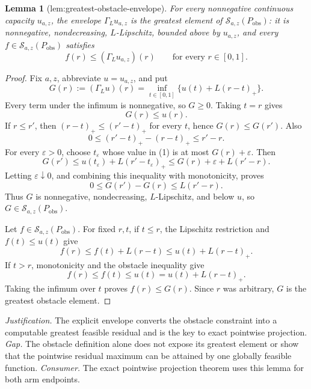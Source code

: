 \documentclass{article}
\newtheorem{lemma}{Lemma}
\begin{document}
\begin{lemma}[lem:greatest-obstacle-envelope]\label{lem:greatest-obstacle-envelope}
For every nonnegative continuous capacity \(u_{a,z}\), the envelope \(\Gamma_Lu_{a,z}\) is the greatest element of \(\mathcal S_{a,z}(P_{\mathrm{obs}})\): it is nonnegative, nondecreasing, \(L\)-Lipschitz, bounded above by \(u_{a,z}\), and every \(f\in\mathcal S_{a,z}(P_{\mathrm{obs}})\) satisfies
\[
f(r)\leq(\Gamma_Lu_{a,z})(r)\qquad\text{for every }r\in[0,1].
\]
\end{lemma}
\begin{proof}
Fix \(a,z\), abbreviate \(u=u_{a,z}\), and put
\[
G(r):=(\Gamma_Lu)(r)=\inf_{t\in[0,1]}\{u(t)+L(r-t)_+\}.
\tag{1}
\]
Every term under the infimum is nonnegative, so \(G\geq0\).  Taking \(t=r\) gives
\[
G(r)\leq u(r).
\tag{2}
\]
If \(r\leq r'\), then \((r-t)_+\leq(r'-t)_+\) for every \(t\), hence \(G(r)\leq G(r')\).  Also
\[
0\leq(r'-t)_+-(r-t)_+\leq r'-r.
\tag{3}
\]
For every \(\varepsilon>0\), choose \(t_\varepsilon\) whose value in (1) is at most \(G(r)+\varepsilon\).  Then
\[
G(r')
\leq u(t_\varepsilon)+L(r'-t_\varepsilon)_+
\leq G(r)+\varepsilon+L(r'-r).
\]
Letting \(\varepsilon\downarrow0\), and combining this inequality with monotonicity, proves
\[
0\leq G(r')-G(r)\leq L(r'-r).
\tag{4}
\]
Thus \(G\) is nonnegative, nondecreasing, \(L\)-Lipschitz, and below \(u\), so \(G\in\mathcal S_{a,z}(P_{\mathrm{obs}})\).

Let \(f\in\mathcal S_{a,z}(P_{\mathrm{obs}})\).  For fixed \(r,t\), if \(t\leq r\), the Lipschitz restriction and \(f(t)\leq u(t)\) give
\[
f(r)\leq f(t)+L(r-t)\leq u(t)+L(r-t)_+.
\]
If \(t>r\), monotonicity and the obstacle inequality give
\[
f(r)\leq f(t)\leq u(t)=u(t)+L(r-t)_+.
\]
Taking the infimum over \(t\) proves \(f(r)\leq G(r)\).  Since \(r\) was arbitrary, \(G\) is the greatest obstacle element.
\end{proof}
\par\smallskip\noindent \textit{Justification.} The explicit envelope converts the obstacle constraint into a computable greatest feasible residual and is the key to exact pointwise projection. \textit{Gap.} The obstacle definition alone does not expose its greatest element or show that the pointwise residual maximum can be attained by one globally feasible function. \textit{Consumer.} The exact pointwise projection theorem uses this lemma for both arm endpoints.
\end{document}
